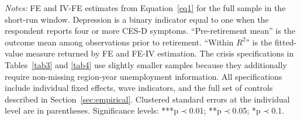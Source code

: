 \documentclass[arguments, manuscript, 11pt]{aastex631}
\begin{document}
\begin{table}[!htbp]
\centering
\renewcommand{\arraystretch}{0.9}
\caption{Retirement and mental health: baseline short-run estimates (2009--2013)}
\label{tab2}
\footnotesize
{}
\tiny{{\singlespacing \emph{Notes:} FE and IV-FE estimates from Equation~\ref{eq1} for the full sample in the short-run window. Depression is a binary indicator equal to one when the respondent reports four or more CES-D symptoms. ``Pre-retirement mean'' is the outcome mean among observations prior to retirement. ``Within $R^2$'' is the fitted-value measure returned by FE and FE-IV estimation. The crisis specifications in Tables~\ref{tab3} and \ref{tab4} use slightly smaller samples because they additionally require non-missing region-year unemployment information. All specifications include individual fixed effects, wave indicators, and the full set of controls described in Section~\ref{sec:empirical}. Clustered standard errors at the individual level are in parentheses. Significance levels: ***p$\prec$0.01; **p$\prec$0.05; *p$\prec$0.1.}}
\end{table}
\end{document}
